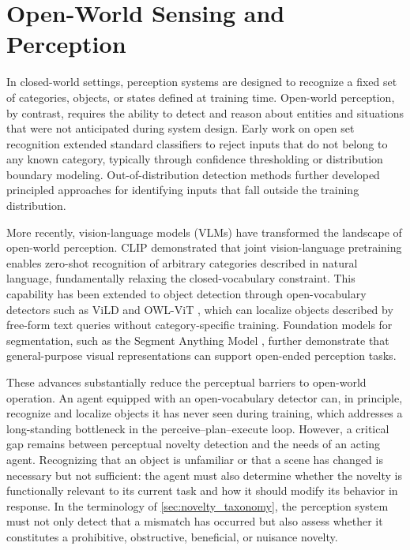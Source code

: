 \section{Open-World Sensing and Perception}
\label{sec:rw_sensing}
\label{sec:open_world_sensing}

In closed-world settings, perception systems are designed to recognize a fixed set of categories, objects, or states defined at training time. Open-world perception, by contrast, requires the ability to detect and reason about entities and situations that were not anticipated during system design. Early work on open set recognition \citep{scheirer2013toward, bendale2016towards} extended standard classifiers to reject inputs that do not belong to any known category, typically through confidence thresholding or distribution boundary modeling. Out-of-distribution detection methods \citep{hendrycks2017baseline} further developed principled approaches for identifying inputs that fall outside the training distribution.

More recently, vision-language models (VLMs) have transformed the landscape of open-world perception. CLIP \citep{radford2021learning} demonstrated that joint vision-language pretraining enables zero-shot recognition of arbitrary categories described in natural language, fundamentally relaxing the closed-vocabulary constraint. This capability has been extended to object detection through open-vocabulary detectors such as ViLD \citep{gu2022openvocabulary} and OWL-ViT \citep{minderer2022simple}, which can localize objects described by free-form text queries without category-specific training. Foundation models for segmentation, such as the Segment Anything Model \citep{kirillov2023segment}, further demonstrate that general-purpose visual representations can support open-ended perception tasks.

These advances substantially reduce the perceptual barriers to open-world operation. An agent equipped with an open-vocabulary detector can, in principle, recognize and localize objects it has never seen during training, which addresses a long-standing bottleneck in the perceive--plan--execute loop. However, a critical gap remains between perceptual novelty detection and the needs of an acting agent. Recognizing that an object is unfamiliar or that a scene has changed is necessary but not sufficient: the agent must also determine whether the novelty is functionally relevant to its current task and how it should modify its behavior in response. In the terminology of \cref{sec:novelty_taxonomy}, the perception system must not only detect that a mismatch has occurred but also assess whether it constitutes a prohibitive, obstructive, beneficial, or nuisance novelty.

